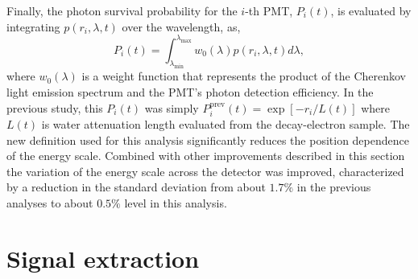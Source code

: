 \documentclass[aps,prd,reprint,superscriptaddress,floatfix,altaffilletter,nofootinbib]{revtex4-2}
\begin{document}
Finally, the photon survival probability for the $i$-th PMT, $P_{i}(t)$, is evaluated by integrating 
$p(r_{i},\lambda,t)$ over the wavelength, as,
\begin{equation}
    P_{i} (t)
    = \int_{\lambda_{\mathrm{min}}}^{\lambda_{\mathrm{max}}}
    w_{0}(\lambda) p(r_{i},\lambda,t)
    d\lambda,
\end{equation}
where $w_{0}(\lambda)$ is a weight function that represents the product of the Cherenkov light emission spectrum and the PMT's photon detection efficiency.
In the previous study, this $P_{i} (t)$ was simply $P_{i}^{\mathrm{prev}} (t) = \exp[-r_{i}/L(t)]$ where $L(t)$ is water attenuation length evaluated from the decay-electron sample. The new definition used for this analysis significantly reduces the position dependence of the energy scale. Combined with other improvements described in this section the variation of the energy scale across the detector was improved, characterized by a reduction in the standard deviation from about $1.7\%$ in the previous analyses to about $0.5\%$ level in this analysis.



\section{Signal extraction}\label{sec:app_solfit}
\end{document}
